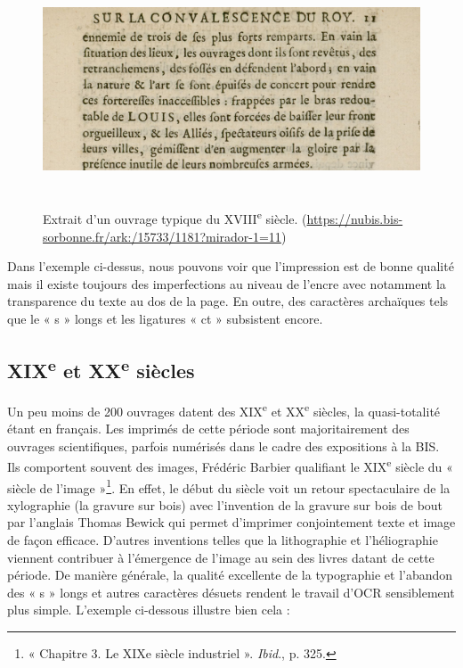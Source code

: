\documentclass[a4paper,12pt,twoside]{book}
\begin{document}
\begin{figure} [H]
	\includegraphics[width=6.17222in,height=2.67569in]{vertopal_157ae480aa4a4b07be198b586a812241/media/image10.png}
	\caption{Extrait d'un ouvrage typique du XVIII\textsuperscript{e}
		siècle.
		(\url{https://nubis.bis-sorbonne.fr/ark:/15733/1181?mirador-1=11})}
\end{figure}

Dans l'exemple ci-dessus, nous pouvons voir que l'impression est de bonne qualité mais il existe toujours des imperfections au niveau de l'encre avec notamment la transparence du texte au dos de la page. En outre, des caractères
archaïques tels que le « s » longs et les ligatures « ct » subsistent encore. 




\subsection{XIX\textsuperscript{e} et XX\textsuperscript{e} siècles}

Un peu moins de 200 ouvrages datent des XIX\textsuperscript{e} et
XX\textsuperscript{e} siècles, la quasi-totalité étant en français. Les
imprimés de cette période sont majoritairement des ouvrages
scientifiques, parfois numérisés dans le cadre des expositions à la BIS. Ils comportent souvent des images, Frédéric Barbier qualifiant le XIX\textsuperscript{e} siècle du « siècle de l'image »\footnote{« Chapitre 3. Le XIXe siècle industriel ». \emph{Ibid}., p. 325.}. En effet, le début du siècle voit un retour spectaculaire de la xylographie (la gravure sur bois) avec l'invention de la gravure sur bois de bout par l'anglais Thomas Bewick qui permet d'imprimer conjointement texte et image de façon efficace. D'autres inventions telles que la lithographie et l'héliographie viennent contribuer à l'émergence de l'image au sein des livres datant de cette période.
De manière générale, la qualité excellente de la typographie et l'abandon des « s » longs et
autres caractères désuets rendent le travail d'OCR sensiblement plus
simple. L'exemple ci-dessous illustre bien cela :
\end{document}
